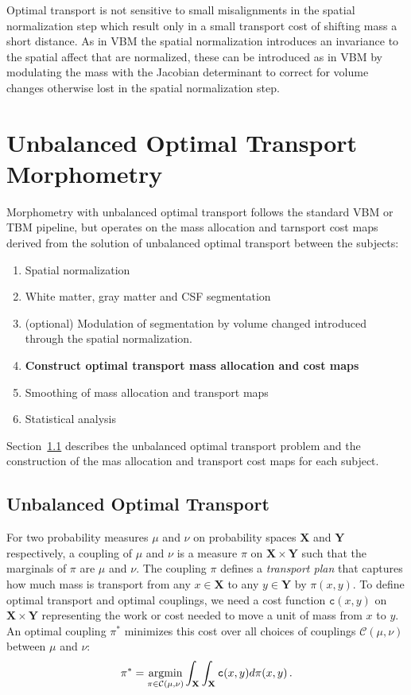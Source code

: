 \documentclass{llncs}
\newcommand{\cost}[0]{\mathtt{c}}
\newcommand{\coupling}[0]{\pi}
\def\argmin{\mathop{\rm argmin}}
\newcommand{\Xsp}{{\mathbf{X}}}
\newcommand{\Ysp}{{\mathbf{Y}}}
\begin{document}
Optimal transport is not sensitive to small misalignments in the spatial
normalization step which result only in a small transport cost of shifting mass
a short distance. As in VBM the spatial normalization introduces an invariance
to the spatial affect that are normalized, these can be introduced as in VBM by
modulating the mass with the Jacobian determinant to correct for volume changes
otherwise lost in the spatial normalization step. 





\section{Unbalanced Optimal Transport Morphometry}
Morphometry with unbalanced optimal transport follows the standard VBM or TBM
pipeline, but operates on the mass allocation and tarnsport cost maps derived
from the solution of unbalanced optimal transport between the subjects:
\begin{enumerate}
\item Spatial normalization
\item White matter, gray matter and CSF segmentation
\item (optional) Modulation of segmentation by volume changed introduced
through the spatial normalization.
\item {\bf Construct optimal transport mass allocation and cost maps}
\item Smoothing of mass allocation and transport maps
\item Statistical analysis
\end{enumerate}

Section~\ref{sec:unbalanced} describes the unbalanced optimal transport problem
and the construction of the mas allocation and transport cost maps for each
subject.



\subsection{Unbalanced Optimal Transport}
\label{sec:unbalanced}
For two probability measures  $\mu$ and $\nu$ on probability spaces ${\Xsp}$
and ${\Ysp}$ respectively, a coupling of $\mu$ and $\nu$ is a measure
$\coupling$ on ${\Xsp}\times{\Ysp}$ such that the marginals of $\coupling$ are
$\mu$ and $\nu$. The coupling $\coupling$ defines a {\em transport plan} that
captures how much mass is transport from any $x \in \Xsp$ to  any $y \in \Ysp$
by $\coupling(x, y)$. To define optimal transport and optimal couplings, we
need a cost function $\cost(x,y)$ on ${\Xsp}\times{\Ysp}$ representing the work
or cost needed to move a unit of mass from $x$ to $y$. An optimal coupling
$\coupling^*$ minimizes this cost over all choices of couplings
$\mathcal{C}(\mu,\nu)$ between
$\mu$ and $\nu$: 
\begin{equation}
  \coupling^*= \argmin_{\coupling\in\mathcal{C}(\mu,\nu)} \int_{{\Xsp}}\int_{{\Xsp}}
\cost(x,y)  d\coupling(x,y) \,.  
\end{equation}
\end{document}
